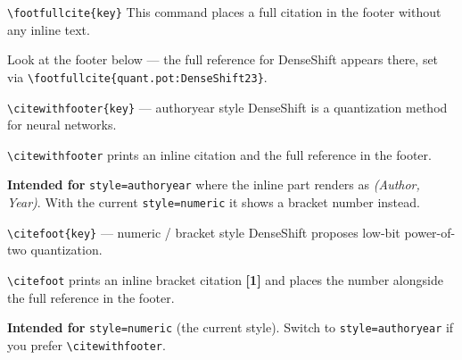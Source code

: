 \documentclass[notes, aspectratio=169]{beamer}       %
\begin{document}

    \begin{frame}{\texttt{\textbackslash footfullcite\{key\}}}
        This command places a full citation in the footer without any inline text.

        Look at the footer below --- the full reference for DenseShift appears there, set via \texttt{\textbackslash footfullcite\{quant.pot:DenseShift23\}}.
    \end{frame}

    \begin{frame}{\texttt{\textbackslash citewithfooter\{key\}} --- authoryear style}
        DenseShift  is a quantization method for neural networks.

        \texttt{\textbackslash citewithfooter} prints an inline citation and the full reference in the footer.

        \medskip

        \textbf{Intended for} \texttt{style=authoryear} where the inline part renders as \textit{(Author, Year)}. With the current \texttt{style=numeric} it shows a bracket number instead.
    \end{frame}

    \begin{frame}{\texttt{\textbackslash citefoot\{key\}} --- numeric / bracket style}
        DenseShift  proposes low-bit power-of-two quantization.

        \texttt{\textbackslash citefoot} prints an inline bracket citation \textbf{[1]} and places the number alongside the full reference in the footer.

        \medskip

        \textbf{Intended for} \texttt{style=numeric} (the current style). Switch to \texttt{style=authoryear} if you prefer \texttt{\textbackslash citewithfooter}.
    \end{frame}
\end{document}

